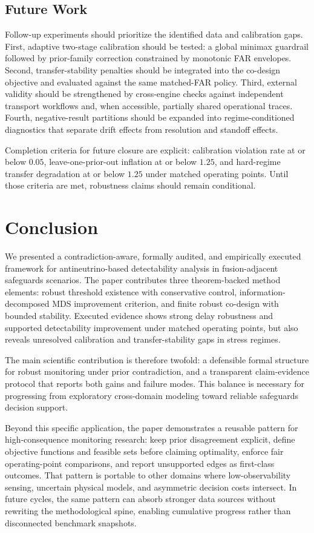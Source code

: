 \documentclass{article} %
\begin{document}
\subsection{Future Work}
Follow-up experiments should prioritize the identified data and calibration gaps. First, adaptive two-stage calibration should be tested: a global minimax guardrail followed by prior-family correction constrained by monotonic FAR envelopes. Second, transfer-stability penalties should be integrated into the co-design objective and evaluated against the same matched-FAR policy. Third, external validity should be strengthened by cross-engine checks against independent transport workflows and, when accessible, partially shared operational traces. Fourth, negative-result partitions should be expanded into regime-conditioned diagnostics that separate drift effects from resolution and standoff effects.

Completion criteria for future closure are explicit: calibration violation rate at or below $0.05$, leave-one-prior-out inflation at or below $1.25$, and hard-regime transfer degradation at or below $1.25$ under matched operating points. Until those criteria are met, robustness claims should remain conditional.

\section{Conclusion}\label{sec:conclusion}
We presented a contradiction-aware, formally audited, and empirically executed framework for antineutrino-based detectability analysis in fusion-adjacent safeguards scenarios. The paper contributes three theorem-backed method elements: robust threshold existence with conservative control, information-decomposed MDS improvement criterion, and finite robust co-design with bounded stability. Executed evidence shows strong delay robustness and supported detectability improvement under matched operating points, but also reveals unresolved calibration and transfer-stability gaps in stress regimes.

The main scientific contribution is therefore twofold: a defensible formal structure for robust monitoring under prior contradiction, and a transparent claim-evidence protocol that reports both gains and failure modes. This balance is necessary for progressing from exploratory cross-domain modeling toward reliable safeguards decision support.

Beyond this specific application, the paper demonstrates a reusable pattern for high-consequence monitoring research: keep prior disagreement explicit, define objective functions and feasible sets before claiming optimality, enforce fair operating-point comparisons, and report unsupported edges as first-class outcomes. That pattern is portable to other domains where low-observability sensing, uncertain physical models, and asymmetric decision costs intersect. In future cycles, the same pattern can absorb stronger data sources without rewriting the methodological spine, enabling cumulative progress rather than disconnected benchmark snapshots.
\end{document}
